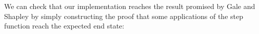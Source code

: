 {We can check that our implementation reaches the result promised by Gale and Shapley by simply constructing the proof that some applications of the step function reach the expected end state:

\begin{code}%
\>[0]\AgdaSpace{}%
\AgdaSpace{}%
\AgdaSpace{}%
\AgdaSymbol{:}\AgdaSpace{}%
\<%
\\
\>[0]\AgdaSpace{}%
\AgdaSymbol{=}\AgdaSpace{}%
\AgdaSpace{}%
\AgdaSpace{}%
\AgdaSpace{}%
\AgdaInductiveConstructor{[]}\AgdaSpace{}%
\AgdaSpace{}%
\AgdaInductiveConstructor{[]}\AgdaSpace{}%
\AgdaSpace{}%
\<%
\end{code}

}
